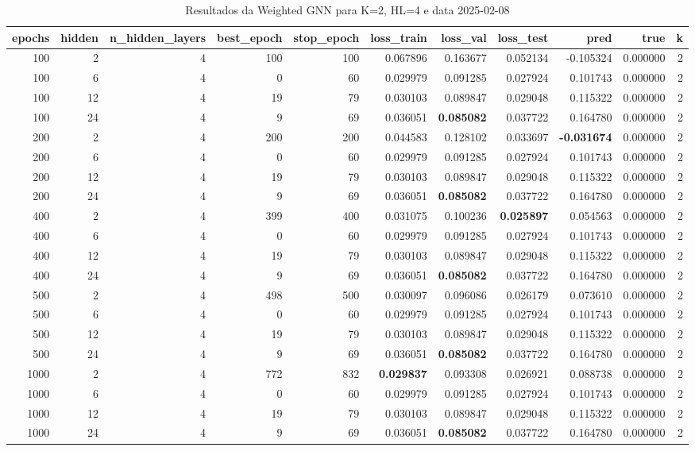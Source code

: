 \begin{table}
\caption{Resultados da Weighted GNN para K=2, HL=4 e data 2025-02-08}
\label{tab:weighted_gnn_results_k2_hl4_d20250208}
\begin{tabular}{rrrrrrrrrrr}
\toprule
epochs & hidden & n\_hidden\_layers & best\_epoch & stop\_epoch & loss\_train & loss\_val & loss\_test & pred & true & k \\
\midrule
100 & 2 & 4 & 100 & 100 & 0.067896 & 0.163677 & 0.052134 & -0.105324 & 0.000000 & 2 \\
100 & 6 & 4 & 0 & 60 & 0.029979 & 0.091285 & 0.027924 & 0.101743 & 0.000000 & 2 \\
100 & 12 & 4 & 19 & 79 & 0.030103 & 0.089847 & 0.029048 & 0.115322 & 0.000000 & 2 \\
100 & 24 & 4 & 9 & 69 & 0.036051 & \textbf{0.085082} & 0.037722 & 0.164780 & 0.000000 & 2 \\
200 & 2 & 4 & 200 & 200 & 0.044583 & 0.128102 & 0.033697 & \textbf{-0.031674} & 0.000000 & 2 \\
200 & 6 & 4 & 0 & 60 & 0.029979 & 0.091285 & 0.027924 & 0.101743 & 0.000000 & 2 \\
200 & 12 & 4 & 19 & 79 & 0.030103 & 0.089847 & 0.029048 & 0.115322 & 0.000000 & 2 \\
200 & 24 & 4 & 9 & 69 & 0.036051 & \textbf{0.085082} & 0.037722 & 0.164780 & 0.000000 & 2 \\
400 & 2 & 4 & 399 & 400 & 0.031075 & 0.100236 & \textbf{0.025897} & 0.054563 & 0.000000 & 2 \\
400 & 6 & 4 & 0 & 60 & 0.029979 & 0.091285 & 0.027924 & 0.101743 & 0.000000 & 2 \\
400 & 12 & 4 & 19 & 79 & 0.030103 & 0.089847 & 0.029048 & 0.115322 & 0.000000 & 2 \\
400 & 24 & 4 & 9 & 69 & 0.036051 & \textbf{0.085082} & 0.037722 & 0.164780 & 0.000000 & 2 \\
500 & 2 & 4 & 498 & 500 & 0.030097 & 0.096086 & 0.026179 & 0.073610 & 0.000000 & 2 \\
500 & 6 & 4 & 0 & 60 & 0.029979 & 0.091285 & 0.027924 & 0.101743 & 0.000000 & 2 \\
500 & 12 & 4 & 19 & 79 & 0.030103 & 0.089847 & 0.029048 & 0.115322 & 0.000000 & 2 \\
500 & 24 & 4 & 9 & 69 & 0.036051 & \textbf{0.085082} & 0.037722 & 0.164780 & 0.000000 & 2 \\
1000 & 2 & 4 & 772 & 832 & \textbf{0.029837} & 0.093308 & 0.026921 & 0.088738 & 0.000000 & 2 \\
1000 & 6 & 4 & 0 & 60 & 0.029979 & 0.091285 & 0.027924 & 0.101743 & 0.000000 & 2 \\
1000 & 12 & 4 & 19 & 79 & 0.030103 & 0.089847 & 0.029048 & 0.115322 & 0.000000 & 2 \\
1000 & 24 & 4 & 9 & 69 & 0.036051 & \textbf{0.085082} & 0.037722 & 0.164780 & 0.000000 & 2 \\
\bottomrule
\end{tabular}
\end{table}

